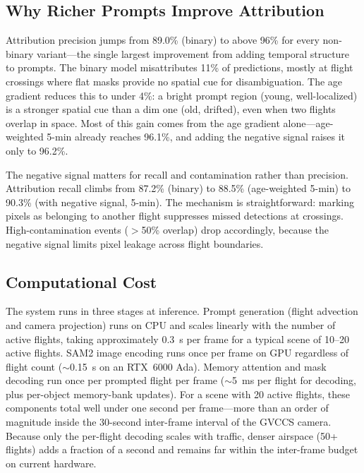 \documentclass[review]{elsarticle}
\begin{document}
\subsection{Why Richer Prompts Improve Attribution}

Attribution precision jumps from 89.0\% (binary) to above 96\% for every non-binary variant---the single largest improvement from adding temporal structure to prompts. The binary model misattributes 11\% of predictions, mostly at flight crossings where flat masks provide no spatial cue for disambiguation. The age gradient reduces this to under 4\%: a bright prompt region (young, well-localized) is a stronger spatial cue than a dim one (old, drifted), even when two flights overlap in space. Most of this gain comes from the age gradient alone---age-weighted 5-min already reaches 96.1\%, and adding the negative signal raises it only to 96.2\%.

The negative signal matters for recall and contamination rather than precision. Attribution recall climbs from 87.2\% (binary) to 88.5\% (age-weighted 5-min) to 90.3\% (with negative signal, 5-min). The mechanism is straightforward: marking pixels as belonging to another flight suppresses missed detections at crossings. High-contamination events ($>$50\% overlap) drop accordingly, because the negative signal limits pixel leakage across flight boundaries.

\subsection{Computational Cost}

The system runs in three stages at inference. Prompt generation (flight advection and camera projection) runs on CPU and scales linearly with the number of active flights, taking approximately 0.3~s per frame for a typical scene of 10--20 active flights. SAM2 image encoding runs once per frame on GPU regardless of flight count ($\sim$0.15~s on an RTX~6000 Ada). Memory attention and mask decoding run once per prompted flight per frame ($\sim$5~ms per flight for decoding, plus per-object memory-bank updates). For a scene with 20 active flights, these components total well under one second per frame---more than an order of magnitude inside the 30-second inter-frame interval of the GVCCS camera. Because only the per-flight decoding scales with traffic, denser airspace (50+ flights) adds a fraction of a second and remains far within the inter-frame budget on current hardware.
\end{document}
